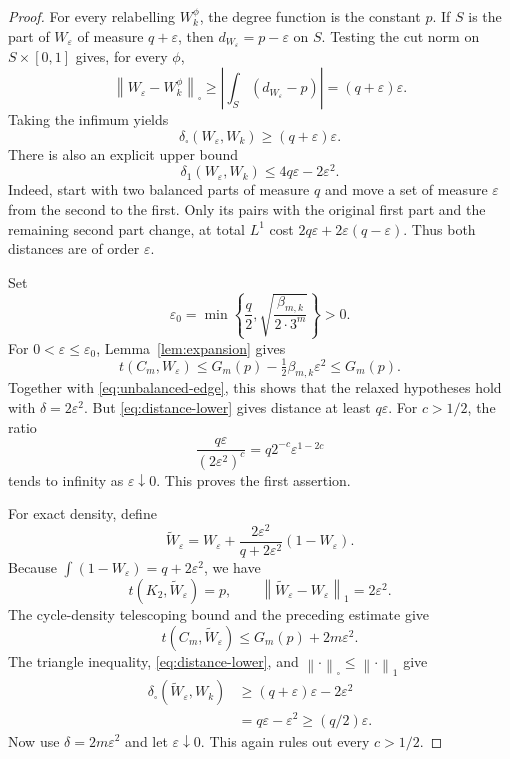 \documentclass[11pt]{article}
\theoremstyle{remark}
\newcommand{\dsq}{\delta_{\square}}
\newcommand{\norm}[1]{\left\lVert #1\right\rVert}
\newcommand{\abs}[1]{\left\lvert #1\right\rvert}
\begin{document}
\begin{proof}
For every relabelling $W_k^\phi$, the degree function is the constant
$p$. If $S$ is the part of $W_\varepsilon$ of measure
$q+\varepsilon$, then $d_{W_\varepsilon}=p-\varepsilon$ on $S$.
Testing the cut norm on $S\times[0,1]$ gives, for every $\phi$,
\[
 \norm{W_\varepsilon-W_k^\phi}_{\square}
 \geq\abs{\int_S(d_{W_\varepsilon}-p)}
 =(q+\varepsilon)\varepsilon.
\]
Taking the infimum yields
\begin{equation}\label{eq:distance-lower}
 \dsq(W_\varepsilon,W_k)\geq(q+\varepsilon)\varepsilon.
\end{equation}
There is also an explicit upper bound
\begin{equation}\label{eq:distance-upper}
 \delta_1(W_\varepsilon,W_k)
 \leq4q\varepsilon-2\varepsilon^2.
\end{equation}
Indeed, start with two balanced parts of measure $q$ and move a set
of measure $\varepsilon$ from the second to the first.
Only its pairs with the original first part and the remaining
second part change, at total $L^1$ cost
$2q\varepsilon+2\varepsilon(q-\varepsilon)$.
Thus both distances are of order $\varepsilon$.

Set
\[
 \varepsilon_0=
 \min\left\{\frac q2,
       \sqrt{\frac{\beta_{m,k}}{2\cdot3^m}}\right\}>0.
\]
For $0<\varepsilon\leq\varepsilon_0$,
Lemma~\ref{lem:expansion} gives
\[
 t(C_m,W_\varepsilon)
 \leq G_m(p)-\tfrac12\beta_{m,k}\varepsilon^2
 \leq G_m(p).
\]
Together with \eqref{eq:unbalanced-edge}, this shows that the relaxed
hypotheses hold with $\delta=2\varepsilon^2$.
But \eqref{eq:distance-lower} gives distance at least $q\varepsilon$.
For $c>1/2$, the ratio
\[
 \frac{q\varepsilon}{(2\varepsilon^2)^c}
 =q2^{-c}\varepsilon^{1-2c}
\]
tends to infinity as $\varepsilon\downarrow0$.
This proves the first assertion.

For exact density, define
\[
 \widetilde W_\varepsilon
 =W_\varepsilon+
   \frac{2\varepsilon^2}{q+2\varepsilon^2}(1-W_\varepsilon).
\]
Because $\int(1-W_\varepsilon)=q+2\varepsilon^2$, we have
\[
 t(K_2,\widetilde W_\varepsilon)=p,
 \qquad
 \norm{\widetilde W_\varepsilon-W_\varepsilon}_1
 =2\varepsilon^2.
\]
The cycle-density telescoping bound and the preceding estimate give
\[
 t(C_m,\widetilde W_\varepsilon)
 \leq G_m(p)+2m\varepsilon^2.
\]
The triangle inequality, \eqref{eq:distance-lower}, and
$\norm{\cdot}_{\square}\leq\norm{\cdot}_1$ give
\begin{align*}
 \dsq(\widetilde W_\varepsilon,W_k)
 &\geq(q+\varepsilon)\varepsilon-2\varepsilon^2\\
 &=q\varepsilon-\varepsilon^2
 \geq(q/2)\varepsilon.
\end{align*}
Now use $\delta=2m\varepsilon^2$ and let $\varepsilon\downarrow0$.
This again rules out every $c>1/2$.
\end{proof}
\end{document}

